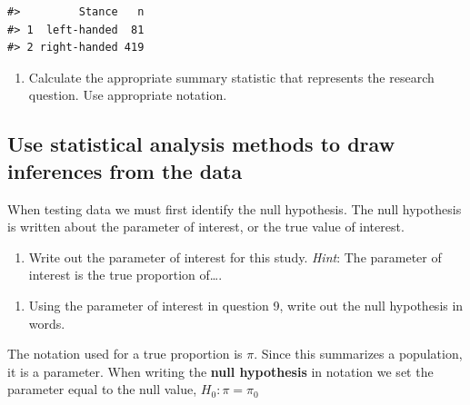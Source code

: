\documentclass[
]{report}
\providecommand{\tightlist}{%
  \setlength{\itemsep}{0pt}\setlength{\parskip}{0pt}}
\begin{document}
\begin{verbatim}
#>         Stance   n
#> 1  left-handed  81
#> 2 right-handed 419
\end{verbatim}

\begin{enumerate}
\def\labelenumi{\arabic{enumi}.}
\setcounter{enumi}{7}
\tightlist
\item
  Calculate the appropriate summary statistic that represents the research question. Use appropriate notation.
\end{enumerate}

\vspace{0.5in}

\hypertarget{use-statistical-analysis-methods-to-draw-inferences-from-the-data}{%
\subsection*{Use statistical analysis methods to draw inferences from the data}\label{use-statistical-analysis-methods-to-draw-inferences-from-the-data}}

When testing data we must first identify the null hypothesis. The null hypothesis is written about the parameter of interest, or the true value of interest.

\begin{enumerate}
\def\labelenumi{\arabic{enumi}.}
\setcounter{enumi}{8}
\tightlist
\item
  Write out the parameter of interest for this study. \emph{Hint}: The parameter of interest is the true proportion of\ldots.
\end{enumerate}

\vspace{1in}

\begin{enumerate}
\def\labelenumi{\arabic{enumi}.}
\setcounter{enumi}{9}
\tightlist
\item
  Using the parameter of interest in question 9, write out the null hypothesis in words.
\end{enumerate}

\vspace{1in}

\newpage

The notation used for a true proportion is \(\pi\). Since this summarizes a population, it is a parameter. When writing the \textbf{null hypothesis} in notation we set the parameter equal to the null value, \(H_0: \pi = \pi_0\)
\end{document}
